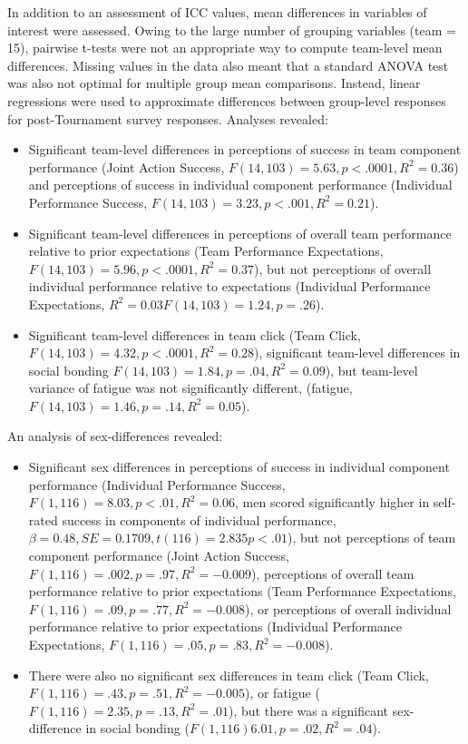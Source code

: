 \documentclass[12pt]{report}
\begin{document}
{In addition to an assessment of ICC values, mean differences in variables of interest were assessed. Owing to the large number of grouping variables (team = 15), pairwise t-tests were not an appropriate way to compute team-level mean differences. Missing values in the data also meant that a standard ANOVA test was also not optimal for multiple group mean comparisons.  Instead, linear regressions were used to approximate differences between group-level responses for post-Tournament survey responses. Analyses revealed:

\begin{itemize}
  \item Significant team-level differences in perceptions of success in team component performance (Joint Action Success, $F(14, 103) = 5.63, p < .0001, R^2 = 0.36$) and perceptions of success in individual component performance (Individual Performance Success, $F(14, 103) = 3.23, p < .001, R^2 = 0.21$).
  \item Significant team-level differences in perceptions of overall team performance relative to prior expectations (Team Performance Expectations, $F(14, 103) = 5.96, p < .0001, R^2 = 0.37$), but not perceptions of overall individual performance relative to expectations (Individual Performance Expectations, $R^2 = 0.03 F(14, 103) = 1.24, p = .26$).
  \item Significant team-level differences in team click (Team Click, $F(14, 103) = 4.32, p < .0001, R^2 = 0.28$), significant team-level differences in social bonding $F(14, 103) = 1.84, p = .04, R^2 = 0.09$), but team-level variance of fatigue was not significantly different, (fatigue, $F(14, 103) = 1.46, p = .14, R^2 = 0.05$).
\end{itemize}

An analysis of sex-differences revealed:
\begin{itemize}
  \item Significant sex differences in perceptions of success in individual component performance (Individual Performance Success, $F(1, 116) = 8.03, p < .01, R^2 = 0.06$, men scored significantly higher in self-rated success in components of individual performance, $\beta = 0.48, SE = 0.1709, t(116) = 2.835 p < .01$), but not perceptions of team component performance (Joint Action Success, $F(1, 116) = .002, p = .97, R^2 = -0.009$), perceptions of overall team performance relative to prior expectations (Team Performance Expectations, $F(1, 116) = .09, p = .77, R^2 = -0.008$), or perceptions of overall individual performance relative to prior expectations (Individual Performance Expectations, $F(1, 116) = .05, p = .83, R^2 = -0.008 $).
  \item There were also no significant sex differences in team click (Team Click, $F(1, 116) = .43, p = .51, R^2 = -0.005$), or fatigue ($F(1, 116) = 2.35, p = .13, R^2 = .01 $), but there was a significant sex-difference in social bonding ($F(1, 116) 6.01, p = .02, R^2 = .04$).
\end{itemize}

}
\end{document}
